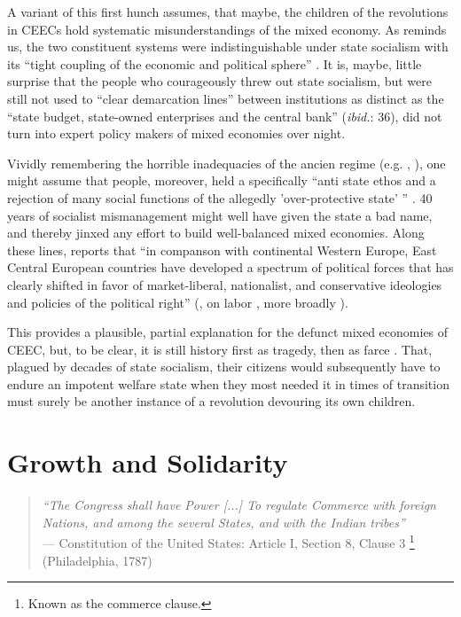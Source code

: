 \documentclass[11pt,a4paper,oneside,openright]{article}
\begin{document}
A variant of this first hunch assumes, that maybe, the children of the revolutions in \glspl{CEEC} hold systematic misunderstandings of the mixed economy. 
As \citeauthor{Bonker2006} reminds us, the two constituent systems were indistinguishable under state socialism with its ``tight coupling of the economic and political sphere'' \citeyearpar[35]{Bonker2006}. 
It is, maybe, little surprise that the people who courageously threw out state socialism, but were still not used to ``clear demarcation lines'' between institutions as distinct as the ``state budget, state-owned enterprises and the central bank'' (\emph{ibid.}: 36), did not turn into expert policy makers of mixed economies over night.

Vividly remembering the horrible inadequacies of the ancien regime (e.g. \citealt{Szikra2009}, \citealt{Millard1992}), one might assume that people, moreover, held a specifically  ``anti state ethos and a rejection of many social functions of the allegedly 'over-protective state' '' \citep[130]{Millard1992}. 
40 years of socialist mismanagement might well have given the state a bad name, and thereby jinxed any effort to build well-balanced mixed economies. 
Along these lines, \citeauthor{Inglot2008} reports that ``in companson with continental Western Europe, East Central European countries have developed a spectrum of political forces that has clearly shifted in favor of market-liberal, nationalist, and conservative ideologies and policies of the political right'' (\citeyear[212]{Inglot2008}, on labor \citealt{Crowley2002}, more broadly \citealt{OrenOuto2001}).

This provides a plausible, partial explanation for the defunct mixed economies of \gls{CEEC}, but, to be clear, it is still history first as tragedy, then as farce \citep{Marx1852}. 
That, plagued by decades of state socialism, their citizens would subsequently have to endure an impotent welfare state when they most needed it in times of transition must surely be another instance of a revolution devouring its own children.

\section{Growth and Solidarity} \label{sec:growth_solidarity}

\begin{quote}
	\emph{``The Congress shall have Power [...] To regulate Commerce with foreign Nations, and among the several States, and with the Indian tribes''}\\
	--- Constitution of the United States: Article I, Section 8, Clause 3
	\footnote{
		Known as the commerce clause.
	} 
	(Philadelphia, 1787)
\end{quote}
\end{document}
